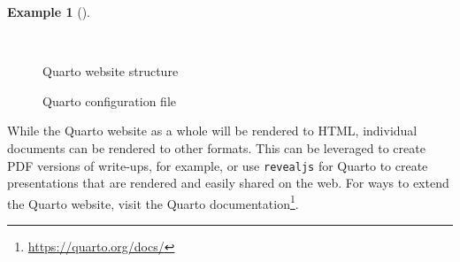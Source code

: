 \documentclass[
  letterpaper,
]{latex/krantz}
\theoremstyle{definition}
\newtheorem{example}{Example}[chapter]
\theoremstyle{remark}
\DeclareRobustCommand{\href}[2]{#2\footnote{\url{#1}}}
\begin{document}
\begin{example}[]\protect\hypertarget{exm-quarto-sites}{}\label{exm-quarto-sites}

~

\begin{figure}

\begin{minipage}{0.50\linewidth}

\begin{codelisting}[H]

\caption{\label{lst-quarto-site}Quarto website structure}


\end{codelisting}%

\end{minipage}%
%
\begin{minipage}{0.50\linewidth}

\begin{codelisting}[H]

\caption{\label{lst-quarto-yml}Quarto configuration file}


\end{codelisting}%

\end{minipage}%

\end{figure}%

\end{example}

While the Quarto website as a whole will be rendered to HTML, individual
documents can be rendered to other formats. This can be leveraged to
create PDF versions of write-ups, for example, or use \texttt{revealjs}
for Quarto to create presentations that are rendered and easily shared
on the web. For ways to extend the Quarto website, visit the
\href{https://quarto.org/docs/}{Quarto documentation}.
\end{document}
